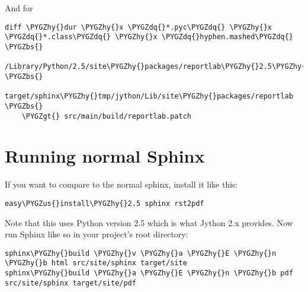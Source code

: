 \documentclass[letterpaper,10pt,english]{sphinxmanual}
\def\PYGZbs{\char`\\}
\def\PYGZus{\char`\_}
\def\PYGZgt{\char`\>}
\def\PYGZhy{\char`\-}
\def\PYGZdq{\char`\"}
\begin{document}
And for 

\begin{Verbatim}[commandchars=\\\{\}]
diff \PYGZhy{}dur \PYGZhy{}x \PYGZdq{}*.pyc\PYGZdq{} \PYGZhy{}x \PYGZdq{}*.class\PYGZdq{} \PYGZhy{}x \PYGZdq{}hyphen.mashed\PYGZdq{} \PYGZbs{}
    /Library/Python/2.5/site\PYGZhy{}packages/reportlab\PYGZhy{}2.5\PYGZhy{}py2.5\PYGZhy{}macosx\PYGZhy{}10.7\PYGZhy{}x86\PYGZus{}64.egg/reportlab \PYGZbs{}
    target/sphinx\PYGZhy{}tmp/jython/Lib/site\PYGZhy{}packages/reportlab \PYGZbs{}
    \PYGZgt{} src/main/build/reportlab.patch
\end{Verbatim}


\chapter{Running normal Sphinx}
\label{development:running-normal-sphinx}
If you want to compare to the normal sphinx, install it like this:

\begin{Verbatim}[commandchars=\\\{\}]
easy\PYGZus{}install\PYGZhy{}2.5 sphinx rst2pdf
\end{Verbatim}

Note that this uses Python version 2.5 which is what Jython 2.x provides.
Now run Sphinx like so in your project's root directory:

\begin{Verbatim}[commandchars=\\\{\}]
sphinx\PYGZhy{}build \PYGZhy{}v \PYGZhy{}a \PYGZhy{}E \PYGZhy{}n \PYGZhy{}b html src/site/sphinx target/site
sphinx\PYGZhy{}build \PYGZhy{}a \PYGZhy{}E \PYGZhy{}n \PYGZhy{}b pdf src/site/sphinx target/site/pdf
\end{Verbatim}
\end{document}
